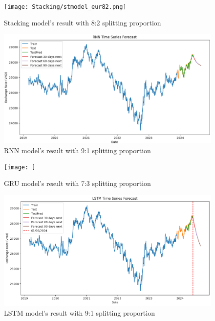 \documentclass{ieeeojies}
\begin{document}
\begin{figure}[H]
  \centering
  \begin{minipage}{0.8\linewidth}
    \centering
    \texttt{[image: Stacking/stmodel\_eur82.png]}
    \caption{Stacking model's result with 8:2 splitting proportion}
    \label{fig13}
  \end{minipage}
\end{figure}
\begin{figure}[H]
  \centering
  \begin{minipage}{0.8\linewidth}
    \centering
    \includegraphics[width=\linewidth]{RNN/rnn_eur_91.png}
    \caption{RNN model's result with 9:1 splitting proportion}
    \label{fig14}
  \end{minipage}
\end{figure}
\begin{figure}[H]
  \centering
  \begin{minipage}{0.8\linewidth}
    \centering
    \texttt{[image: ]}
    \caption{GRU model's result with 7:3 splitting proportion}
    \label{fig15}
  \end{minipage}
\end{figure}
\begin{figure}[H]
  \centering
  \begin{minipage}{0.8\linewidth}
    \centering
    \includegraphics[width=\linewidth]{LSTM/lstm_eur91.png}
    \caption{LSTM model's result with 9:1 splitting proportion}
    \label{fig16}
  \end{minipage}
\end{figure}
\end{document}
